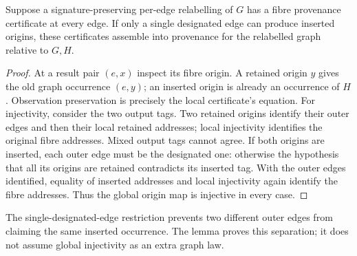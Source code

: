 \begin{lemma}
Suppose a signature-preserving per-edge relabelling of $G$ has a fibre provenance
certificate at every edge. If only a single designated edge can produce inserted
origins, these certificates assemble into provenance for the relabelled graph
relative to $G,H$.
\end{lemma}
\begin{proof}
At a result pair $(e,x)$ inspect its fibre origin. A retained origin $y$ gives
the old graph occurrence $(e,y)$; an inserted origin is already an occurrence
of $H$. Observation preservation is precisely the local certificate's equation.
For injectivity, consider the two output tags. Two retained origins identify
their outer edges and then their local retained addresses; local injectivity
identifies the original fibre addresses. Mixed output tags cannot agree.
If both origins are inserted, each outer edge must be the designated one:
otherwise the hypothesis that all its origins are retained contradicts its
inserted tag. With the outer edges identified, equality of inserted addresses
and local injectivity again identify the fibre addresses. Thus the global
origin map is injective in every case.
\end{proof}
The single-designated-edge restriction prevents two different outer edges from
claiming the same inserted occurrence. The lemma proves this separation; it
does not assume global injectivity as an extra graph law.

